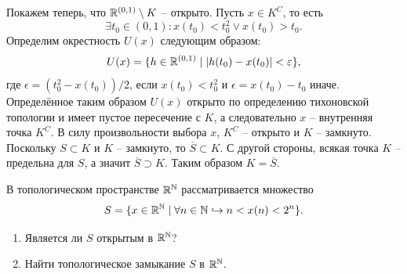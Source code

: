 \begin{solve}
\begin{enumerate}
        Покажем теперь, что $\mathbb{R}^{(0, 1)} \setminus K$ -- открыто. Пусть $x \in K^C$, то есть
        \[
            \exists t_0 \in (0, 1)\colon x(t_0) < t_0^2 \vee x(t_0) > t_0.
        \]
        Определим окрестность $U(x)$ следующим образом:
        \[
            U(x) = \{h \in \mathbb{R}^{(0, 1)} \mid |h(t_0) - x(t_0)| < \varepsilon\},
        \]
        где $\epsilon = (t_0^2 - x(t_0)) / 2$, если $x(t_0) < t_0^2$ и $\epsilon = x(t_0) - t_0$ иначе. Определённое таким образом $U(x)$ открыто по определению тихоновской топологии и имеет пустое пересечение с $K$, а следовательно $x$ -- внутренняя точка $K^C$. В силу произвольности выбора $x$, $K^C$ -- открыто и $K$ -- замкнуто. \\
        Поскольку $S \subset K$ и $K$ -- замкнуто, то $\overline{S} \subset K$. С другой стороны, всякая точка $K$ -- предельна для $S$, а значит $\overline{S} \supset K$. Таким образом $K = \overline{S}$.
    \end{enumerate}
\end{solve}
\begin{task}[T8]
    В топологическом пространстве $\mathbb{R}^{\mathbb{N}}$ рассматривается множество
    \[
        S = \{x \in \mathbb{R}^{\mathbb{N}} \mid \forall n \in \mathbb{N} \hookrightarrow n < x(n) < 2^n\}.
    \]
    \begin{enumerate}
        \item Является ли $S$ открытым в $\mathbb{R}^{\mathbb{N}}$?
        \item Найти топологическое замыкание $S$ в $\mathbb{R}^{\mathbb{N}}$.
    \end{enumerate}
\end{task}

